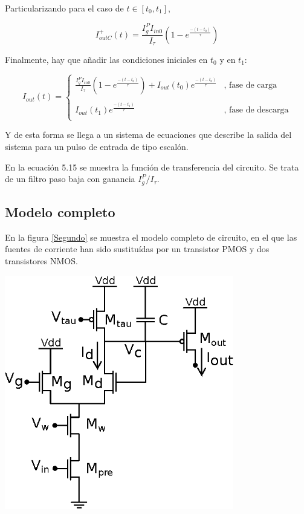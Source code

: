 Particularizando para el caso de $t\in [t_0,t_1]$,

\begin{equation}
I_{outC}^+(t)=\frac{I_g^PI_{in0}}{I_{\tau}}(1-e^{\frac{-(t-t_0)}{\tau}})
\end{equation}

Finalmente, hay que añadir las condiciones iniciales en $t_0$ y en $t_1$:

\[I_{out}(t)=\left\{ \begin{array}{lc}
\frac{I_g^PI_{in0}}{I_{\tau}}(1-e^{\frac{-(t-t_0)}{\tau}})+I_{out}(t_0)e^{\frac{-(t-t_0)}{\tau}} & \mbox{, fase de carga} \\
           &            \\
    I_{out}(t_1)e^{\frac{-(t-t_1)}{\tau}} & \mbox{, fase de descarga}\\
\end{array}
\right. \] 

Y de esta forma se llega a un sistema de ecuaciones que describe la salida del sistema para un pulso de entrada de tipo escalón.

En la ecuación 5.15 se muestra la función de transferencia del circuito. Se trata de un filtro paso baja con ganancia $I_g^P/I_{\tau}$. 

\subsection{Modelo completo}

En la figura \ref{Segundo} se muestra el modelo completo de circuito, en el que las fuentes de corriente han sido sustituídas por un transistor PMOS y dos transistores NMOS. 

	\begin{center}
		\includegraphics[width=10cm]{Imagenes/Sinaptico/Segundo.eps}
    		\label{Segundo}
	\end{center}	
	

